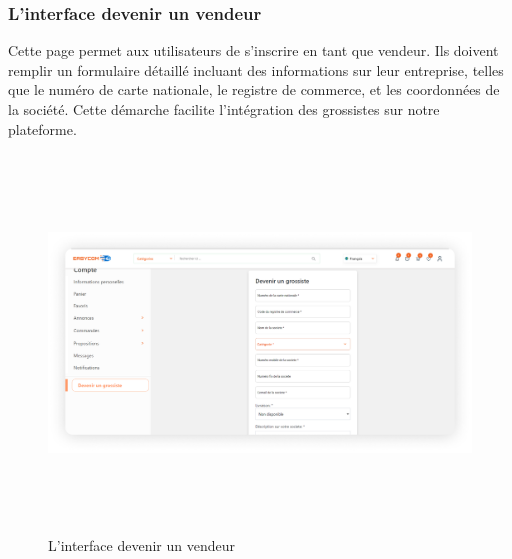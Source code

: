 \documentclass[edit,12pt,a4paper,ChapStyle,oneside,doubleinterligne]{report}
\begin{document}
\subsubsection{L'interface devenir un vendeur}
Cette page permet aux utilisateurs de s'inscrire en tant que vendeur. Ils doivent remplir un formulaire détaillé incluant des informations sur leur entreprise, telles que le numéro de carte nationale, le registre de commerce, et les coordonnées de la société. Cette démarche facilite l'intégration des grossistes sur notre plateforme.
  \begin{figure} [H]
    \centering
    \includegraphics[width = 15.319375cm , height = 10cm , angle=360]{images/devenir grossiste 1.png}
    \caption{L'interface devenir un vendeur}
    \label{fig:Devenir un grossiste}
\end{figure}
\end{document}
